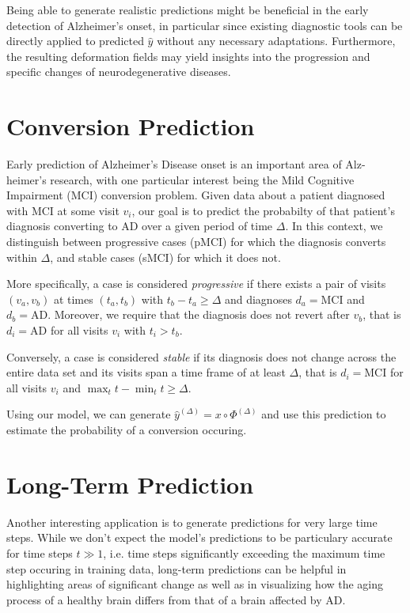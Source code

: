 Being able to generate realistic predictions might be beneficial in the early detection of Alzheimer's onset, in particular since existing diagnostic tools can be directly applied to predicted $\hat y$ without any necessary adaptations. Furthermore, the resulting deformation fields may yield insights into the progression and specific changes of neurodegenerative diseases.

\section{Conversion Prediction} \label{sec:appconvpred}
Early prediction of Alzheimer's Disease onset is an important area of Alz-heimer's research, with one particular interest being the Mild Cognitive Impairment (MCI) conversion problem. Given data about a patient diagnosed with MCI at some visit $v_i$, our goal is to predict the probabilty of that patient's diagnosis converting to AD over a given period of time $ \Delta $. 
In this context, we distinguish between progressive cases (pMCI) for which the diagnosis converts within $\Delta$, and stable cases (sMCI) for which it does not.

More specifically, a case is considered \textit{progressive} if there exists a pair of visits $(v_a, v_b)$ at times $(t_a, t_b)$ with $ t_b - t_a \geq \Delta $ and diagnoses $d_a = \text{MCI} $ and $d_b = \text{AD} $. Moreover, we require that the diagnosis does not revert after $v_b$, that is $ d_i = \text{AD} $ for all visits $v_i$ with $t_i > t_b$.

Conversely, a case is considered \textit{stable} if its diagnosis does not change across the entire data set and its visits span a time frame of at least $\Delta$, that is $ d_i = \text{MCI} $ for all visits $v_i$ and $ { \max_{t} t -  \min_{t} t \geq \Delta } $.

Using our model, we can generate $\hat y^{(\Delta)} = x \circ \Phi^{(\Delta)}$ and use this prediction to estimate the probability of a conversion occuring.

\section{Long-Term Prediction}
Another interesting application is to generate predictions for very large time steps. While we don't expect the model's predictions to be particulary accurate for time steps $t \gg 1$, i.e. time steps significantly exceeding the maximum time step occuring in training data, long-term predictions can be helpful in highlighting areas of significant change as well as in visualizing how the aging process of a healthy brain differs from that of a brain affected by AD.

